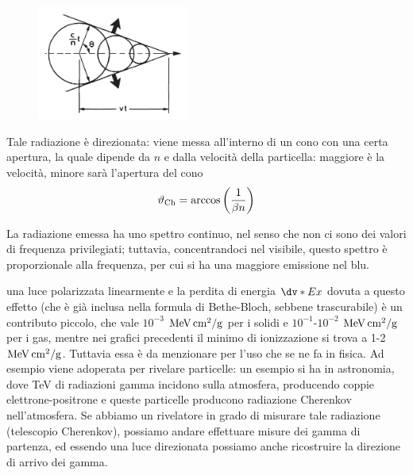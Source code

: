 \begin{minipage}{0.395\textwidth}
    \begin{figure}[H]
        \centering
        \includegraphics[width=5cm]{immagini/Effetto_Cherenkov.png}
    \end{figure}
\end{minipage}
\begin{minipage}{0.6\textwidth}
    \vspace{0.6cm}Tale radiazione è direzionata: viene messa all'interno di un cono con una certa apertura, la quale dipende da $n$ e dalla velocità della particella: maggiore è la velocità, minore sarà l'apertura del cono
    \begin{equation*}
        \vartheta_{\rm Ch}
        =\arccos{\left(\frac{1}{\beta n}\right)}
    \end{equation*}
\end{minipage}

\vspace{0.2cm}La radiazione emessa ha uno spettro continuo, nel senso che non ci sono dei valori di frequenza privilegiati; tuttavia, concentrandoci nel visibile, questo spettro è proporzionale alla frequenza, per cui si ha una maggiore emissione nel blu.

\E una luce polarizzata linearmente e la perdita di energia $\dv*{E}{x}$ dovuta a questo effetto (che è già inclusa nella formula di Bethe-Bloch, sebbene trascurabile) è un contributo piccolo, che vale $10^{-3}$ $\rm MeV \, cm^2/g$ per i solidi e $10^{-1}$-$10^{-2}$ $\rm MeV \, cm^2/g$ per i gas, mentre nei grafici precedenti il minimo di ionizzazione si trova a 1-2 $\rm MeV \, cm^2/g$. Tuttavia essa è da menzionare per l'uso che se ne fa in fisica. Ad esempio viene adoperata per rivelare particelle: un esempio si ha in astronomia, dove TeV di radiazioni gamma incidono sulla atmosfera, producendo coppie elettrone-positrone e queste particelle producono radiazione Cherenkov nell'atmosfera. Se abbiamo un rivelatore in grado di misurare tale radiazione (telescopio Cherenkov), possiamo andare effettuare misure dei gamma di partenza, ed essendo una luce direzionata possiamo anche ricostruire la direzione di arrivo dei gamma.


